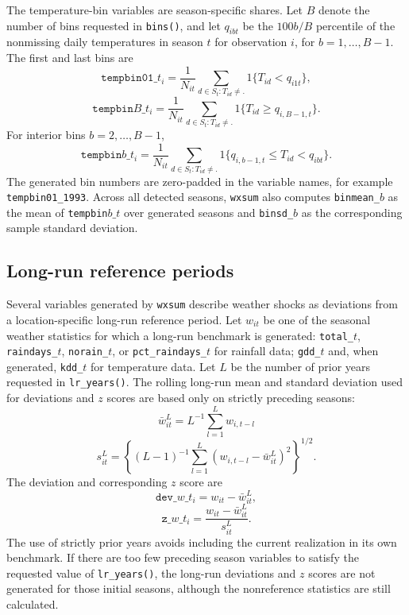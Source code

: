 The temperature-bin variables are season-specific shares. Let $B$ denote the number of bins requested in \texttt{bins()}, and let $q_{ibt}$ be the $100b/B$ percentile of the nonmissing daily temperatures in season $t$ for observation $i$, for $b=1,\ldots,B-1$. The first and last bins are
\[
\texttt{tempbin01\_}t_i=\frac{1}{N_{it}}\sum_{d\in S_t:T_{id}\ne .}1\{T_{id}<q_{i1t}\},
\]
\[
\texttt{tempbin}B\texttt{\_}t_i=\frac{1}{N_{it}}\sum_{d\in S_t:T_{id}\ne .}1\{T_{id}\geq q_{i,B-1,t}\}.
\]
For interior bins $b=2,\ldots,B-1$,
\[
\texttt{tempbin}b\texttt{\_}t_i=\frac{1}{N_{it}}\sum_{d\in S_t:T_{id}\ne .}1\{q_{i,b-1,t}\leq T_{id}<q_{ibt}\}.
\]
The generated bin numbers are zero-padded in the variable names, for example \texttt{tempbin01\_1993}. Across all detected seasons, \texttt{wxsum} also computes \texttt{binmean\_}$b$ as the mean of \texttt{tempbin}$b\_t$ over generated seasons and \texttt{binsd\_}$b$ as the corresponding sample standard deviation.

\subsection{Long-run reference periods}

Several variables generated by \texttt{wxsum} describe weather shocks as deviations from a location-specific long-run reference period. Let $w_{it}$ be one of the seasonal weather statistics for which a long-run benchmark is generated: \texttt{total\_}$t$, \texttt{raindays\_}$t$, \texttt{norain\_}$t$, or \texttt{pct\_raindays\_}$t$ for rainfall data; \texttt{gdd\_}$t$ and, when generated, \texttt{kdd\_}$t$ for temperature data. Let $L$ be the number of prior years requested in \texttt{lr\_years()}. The rolling long-run mean and standard deviation used for deviations and $z$ scores are based only on strictly preceding seasons:
\[
\bar{w}_{it}^{L}=L^{-1}\sum_{l=1}^{L} w_{i,t-l}
\]
\[
s_{it}^{L}=\left\{(L-1)^{-1}\sum_{l=1}^{L}\left(w_{i,t-l}-\bar{w}_{it}^{L}\right)^2\right\}^{1/2}.
\]
The deviation and corresponding $z$ score are
\[
\texttt{dev\_}w\texttt{\_}t_i=w_{it}-\bar{w}_{it}^{L},
\]
\[
\texttt{z\_}w\texttt{\_}t_i=\frac{w_{it}-\bar{w}_{it}^{L}}{s_{it}^{L}}.
\]
The use of strictly prior years avoids including the current realization in its own benchmark. If there are too few preceding season variables to satisfy the requested value of \texttt{lr\_years()}, the long-run deviations and $z$ scores are not generated for those initial seasons, although the nonreference statistics are still calculated.


